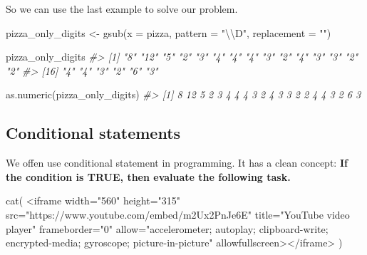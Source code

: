 \documentclass[
]{article}
\newenvironment{Shaded}{\begin{snugshade}}{\end{snugshade}}
\newcommand{\AttributeTok}[1]{\textcolor[rgb]{0.77,0.63,0.00}{#1}}
\newcommand{\CommentTok}[1]{\textcolor[rgb]{0.56,0.35,0.01}{\textit{#1}}}
\newcommand{\FunctionTok}[1]{\textcolor[rgb]{0.00,0.00,0.00}{#1}}
\newcommand{\NormalTok}[1]{#1}
\newcommand{\OtherTok}[1]{\textcolor[rgb]{0.56,0.35,0.01}{#1}}
\newcommand{\SpecialCharTok}[1]{\textcolor[rgb]{0.00,0.00,0.00}{#1}}
\newcommand{\StringTok}[1]{\textcolor[rgb]{0.31,0.60,0.02}{#1}}
\begin{document}
So we can use the last example to solve our problem.

\begin{Shaded}
\begin{Highlighting}[]
\NormalTok{pizza\_only\_digits }\OtherTok{\textless{}{-}} \FunctionTok{gsub}\NormalTok{(}\AttributeTok{x =}\NormalTok{ pizza, }\AttributeTok{pattern =} \StringTok{"}\SpecialCharTok{\textbackslash{}\textbackslash{}}\StringTok{D"}\NormalTok{, }\AttributeTok{replacement =} \StringTok{""}\NormalTok{) }

\NormalTok{pizza\_only\_digits}
\CommentTok{\#\textgreater{}  [1] "8"  "12" "5"  "2"  "3"  "4"  "4"  "4"  "3"  "2"  "4"  "3"  "3"  "2"  "2" }
\CommentTok{\#\textgreater{} [16] "4"  "4"  "3"  "2"  "6"  "3"}

\FunctionTok{as.numeric}\NormalTok{(pizza\_only\_digits)}
\CommentTok{\#\textgreater{}  [1]  8 12  5  2  3  4  4  4  3  2  4  3  3  2  2  4  4  3  2  6  3}
\end{Highlighting}
\end{Shaded}

\hypertarget{conditional-statements}{%
\subsection{Conditional statements}\label{conditional-statements}}

We offen use conditional statement in programming. It has a clean concept: \textbf{If the condition is TRUE, then evaluate the following task.}

\begin{Shaded}
\begin{Highlighting}[]
\FunctionTok{cat}\NormalTok{(}
  \StringTok{\textquotesingle{}\textless{}iframe width="560" height="315" src="https://www.youtube.com/embed/m2Ux2PnJe6E" title="YouTube video player" frameborder="0" allow="accelerometer; autoplay; clipboard{-}write; encrypted{-}media; gyroscope; picture{-}in{-}picture" allowfullscreen\textgreater{}\textless{}/iframe\textgreater{}\textquotesingle{}}
\NormalTok{)}
\end{Highlighting}
\end{Shaded}


  
\end{document}
